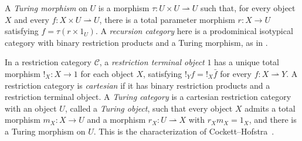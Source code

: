 A \emph{Turing morphism} on $U$ is a morphism
$\tau:U\times U\rightharpoonup U$ such that, for every object $X$
and every $f:X\times U\rightharpoonup U$, there is a total
parameter morphism $r:X\to U$ satisfying $f=\tau(r\times1_U)$.
A \emph{recursion category} here is a prodominical isotypical
category with binary restriction products and a Turing morphism,
as in \cite[Section 9]{Heller}.

In a restriction category $\mathcal C$, a \emph{restriction terminal object}
$1$ has a unique total morphism $!_X:X\to1$ for each object $X$,
satisfying $!_Yf=!_X\bar f$ for every $f:X\rightharpoonup Y$.
A restriction category is \emph{cartesian} if it has binary
restriction products and a restriction terminal object.
A \emph{Turing category} is a cartesian restriction category with an
object $U$, called a \emph{Turing object}, such that every object $X$
admits a total morphism $m_X:X\to U$ and a morphism
$r_X:U\rightharpoonup X$ with $r_Xm_X=1_X$, and there is a
Turing morphism on $U$. This is the characterization of
Cockett--Hofstra~\cite[Theorem 3.4]{CockettHofstra}.

